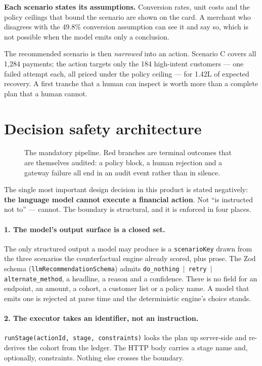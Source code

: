 \documentclass[10pt,twocolumn,a4paper]{article}
\newcommand{\rs}{\rupee}%
\newcommand{\rs}{\textrm{INR}\,}%
\newcommand{\code}[1]{\texttt{\small #1}}
\begin{document}
\textbf{Each scenario states its assumptions.} Conversion rates, unit costs and
the policy ceilings that bound the scenario are shown on the card. A merchant
who disagrees with the 49.8\% conversion assumption can see it and say so, which
is not possible when the model emits only a conclusion.

The recommended scenario is then \emph{narrowed} into an action. Scenario C
covers all 1{,}284 payments; the action targets only the 184 high-intent
customers --- one failed attempt each, all priced under the policy ceiling ---
for \rs{}1.42L of expected recovery. A first tranche that a human can inspect is
worth more than a complete plan that a human cannot.

\section{Decision safety architecture}
\label{sec:safety}

\begin{figure}[t]
  \centering
  \resizebox{0.86\textwidth}{!}{}
  \caption{The mandatory pipeline. Red branches are terminal outcomes that are
  themselves audited: a policy block, a human rejection and a gateway failure all
  end in an audit event rather than in silence.}
  \label{fig:pipeline}
\end{figure}

The single most important design decision in this product is stated negatively:
\textbf{the language model cannot execute a financial action}. Not ``is
instructed not to'' --- cannot. The boundary is structural, and it is enforced in
four places.

\paragraph{1. The model's output surface is a closed set.}
The only structured output a model may produce is a \code{scenarioKey} drawn
from the three scenarios the counterfactual engine already scored, plus prose.
The Zod schema (\code{llmRecommendationSchema}) admits
\code{do\_nothing $\mid$ retry $\mid$ alternate\_method}, a headline, a reason
and a confidence. There is no field for an endpoint, an amount, a cohort, a
customer list or a policy name. A model that emits one is rejected at parse time
and the deterministic engine's choice stands.

\paragraph{2. The executor takes an identifier, not an instruction.}
\code{runStage(actionId, stage, constraints)} looks the plan up server-side and
re-derives the cohort from the ledger. The HTTP body carries a stage name and,
optionally, constraints. Nothing else crosses the boundary.
\end{document}
